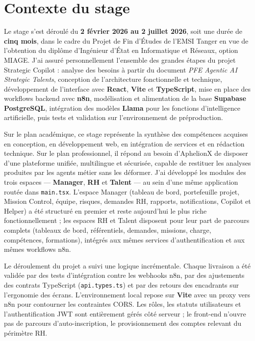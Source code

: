 \section{Contexte du stage}

Le stage s'est déroulé du \textbf{2 février 2026 au 2 juillet 2026}, soit une durée de \textbf{cinq mois}, dans le cadre du Projet de Fin d'Études de l'EMSI Tanger en vue de l'obtention du diplôme d'Ingénieur d'État en Informatique et Réseaux, option MIAGE. J'ai assuré personnellement l'ensemble des grandes étapes du projet Strategic Copilot : analyse des besoins à partir du document \emph{PFE Agentic AI Strategic Talents}, conception de l'architecture fonctionnelle et technique, développement de l'interface avec \textbf{React}, \textbf{Vite} et \textbf{TypeScript}, mise en place des workflows backend avec \textbf{n8n}, modélisation et alimentation de la base \textbf{Supabase PostgreSQL}, intégration des modèles \textbf{Llama} pour les fonctions d'intelligence artificielle, puis tests et validation sur l'environnement de préproduction.

Sur le plan académique, ce stage représente la synthèse des compétences acquises en conception, en développement web, en intégration de services et en rédaction technique. Sur le plan professionnel, il répond au besoin d'AphelionX de disposer d'une plateforme unifiée, multilingue et sécurisée, capable de restituer les analyses produites par les agents métier sans les déformer. J'ai développé les modules des trois espaces --- \textbf{Manager}, \textbf{RH} et \textbf{Talent} --- au sein d'une même application routée dans \texttt{main.tsx}. L'espace Manager (tableau de bord, portefeuille projet, Mission Control, équipe, risques, demandes RH, rapports, notifications, Copilot et Helper) a été structuré en premier et reste aujourd'hui le plus riche fonctionnellement ; les espaces RH et Talent disposent pour leur part de parcours complets (tableaux de bord, référentiels, demandes, missions, charge, compétences, formations), intégrés aux mêmes services d'authentification et aux mêmes workflows n8n.

Le déroulement du projet a suivi une logique incrémentale. Chaque livraison a été validée par des tests d'intégration contre les webhooks n8n, par des ajustements des contrats TypeScript (\texttt{api.types.ts}) et par des retours des encadrants sur l'ergonomie des écrans. L'environnement local repose sur \textbf{Vite} avec un proxy vers n8n pour contourner les contraintes CORS. Les rôles, les statuts utilisateurs et l'authentification JWT sont entièrement gérés côté serveur ; le front-end n'ouvre pas de parcours d'auto-inscription, le provisionnement des comptes relevant du périmètre RH.

